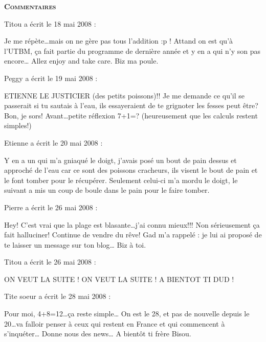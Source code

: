 \bigskip
\textbf{\textsc{Commentaires}}

\medskip
Titou a écrit le 18 mai 2008 :
\begin{displayquote}
Je me répète\dots mais on ne gère pas tous l'addition :p ! Attand on est qu'à l'UTBM, ça fait partie du programme de dernière année  et y en a qui n'y son pas encore\dots
Allez enjoy and take care. Biz ma poule.
\end{displayquote}

\medskip
Peggy a écrit le 19 mai 2008 :
\begin{displayquote}
ETIENNE LE JUSTICIER (des petits poissons)!!
Je me demande ce qu'il se passerait si tu sautais à l'eau, ils essayeraient de te grignoter les fesses peut être?
Bon, je sors!
Avant\dots petite réflexion 7+1=? (heureusement que les calculs restent simples!)
\end{displayquote}

\medskip
Etienne a écrit le 20 mai 2008 :
\begin{displayquote}
Y en a un qui m'a gniaqué le doigt, j'avais posé un bout de pain dessus et approché de l'eau car ce sont des poissons cracheurs, ils visent le bout de pain et le font tomber pour le récupérer. Seulement celui-ci m'a mordu le doigt, le suivant a mis un coup de boule dans le pain pour le faire tomber.
\end{displayquote}

\medskip
Pierre a écrit le 26 mai 2008 :
\begin{displayquote}
Hey!
C'est vrai que la plage est blasante\dots j'ai connu mieux!!!
Non sérieusement ça fait halluciner!
Continue de vendre du rêve!
Gad m'a rappelé : je lui ai proposé de te laisser un message sur ton blog\dots
Biz à toi.
\end{displayquote}

\medskip
Titou a écrit le 26 mai 2008 :
\begin{displayquote}
ON VEUT LA SUITE ! ON VEUT LA SUITE !
A BIENTOT TI DUD !
\end{displayquote}

\medskip
Tite soeur a écrit le 28 mai 2008 :
\begin{displayquote}
Pour moi, 4+8=12\dots ça reste simple\dots
On est le 28, et pas de nouvelle depuis le 20\dots va falloir penser à ceux qui restent en France et qui commencent à s'inquéter\dots
Donne nous des news\dots
A bientôt ti frère
Bisou.
\end{displayquote}

\vfill
